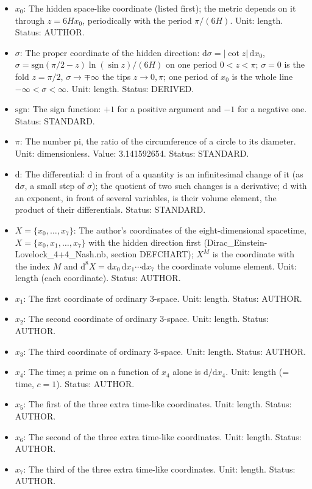 \documentclass[
  10pt,
]{article}
\begin{document}
\begin{itemize}
  \(\pi/(6H)\) of \(x_0\), the Lovelock couplings
  \(\alpha_{(p)} = w_{(p)}H^{2-2p}\) and the cosmological constant
  \(\Lambda = -7H^2\) (the author's original value \(-10H^2\) was
  corrected on 2026-10-25); in UM-3 a free parameter. Unit: GeV
  (1/length). Status: AUTHOR.
\item
  \(x_0\): The hidden space-like coordinate (listed first); the metric
  depends on it through \(z = 6Hx_0\), periodically with the period
  \(\pi/(6H)\). Unit: length. Status: AUTHOR.
\item
  \(\sigma\): The proper coordinate of the hidden direction:
  \(\mathrm{d}\sigma = \lvert\cot z\rvert\,\mathrm{d}x_0\),
  \(\sigma = \mathrm{sgn}(\pi/2 - z)\ln(\sin z)/(6H)\) on one period
  \(0 < z < \pi\); \(\sigma = 0\) is the fold \(z = \pi/2\),
  \(\sigma \to \mp\infty\) the tips \(z \to 0, \pi\); one period of
  \(x_0\) is the whole line \(-\infty < \sigma < \infty\). Unit: length.
  Status: DERIVED.
\item
  \(\mathrm{sgn}\): The sign function: \(+1\) for a positive argument
  and \(-1\) for a negative one. Status: STANDARD.
\item
  \(\pi\): The number pi, the ratio of the circumference of a circle to
  its diameter. Unit: dimensionless. Value: 3.141592654. Status:
  STANDARD.
\item
  \(\mathrm{d}\): The differential: \(\mathrm{d}\) in front of a
  quantity is an infinitesimal change of it (as \(\mathrm{d}\sigma\), a
  small step of \(\sigma\)); the quotient of two such changes is a
  derivative; \(\mathrm{d}\) with an exponent, in front of several
  variables, is their volume element, the product of their
  differentials. Status: STANDARD.
\item
  \(X = \{x_0, \dots, x_7\}\): The author's coordinates of the
  eight-dimensional spacetime, \(X = \{x_0, x_1, \dots, x_7\}\) with the
  hidden direction first (Dirac\_Einstein-Lovelock\_4+4\_Nash.nb,
  section DEFCHART); \(X^M\) is the coordinate with the index \(M\) and
  \(\mathrm{d}^8X = \mathrm{d}x_0\,\mathrm{d}x_1\cdots\mathrm{d}x_7\)
  the coordinate volume element. Unit: length (each coordinate). Status:
  AUTHOR.
\item
  \(x_1\): The first coordinate of ordinary 3-space. Unit: length.
  Status: AUTHOR.
\item
  \(x_2\): The second coordinate of ordinary 3-space. Unit: length.
  Status: AUTHOR.
\item
  \(x_3\): The third coordinate of ordinary 3-space. Unit: length.
  Status: AUTHOR.
\item
  \(x_4\): The time; a prime on a function of \(x_4\) alone is
  \(\mathrm{d}/\mathrm{d}x_4\). Unit: length (= time, \(c = 1\)).
  Status: AUTHOR.
\item
  \(x_5\): The first of the three extra time-like coordinates. Unit:
  length. Status: AUTHOR.
\item
  \(x_6\): The second of the three extra time-like coordinates. Unit:
  length. Status: AUTHOR.
\item
  \(x_7\): The third of the three extra time-like coordinates. Unit:
  length. Status: AUTHOR.
\end{itemize}
\end{document}
